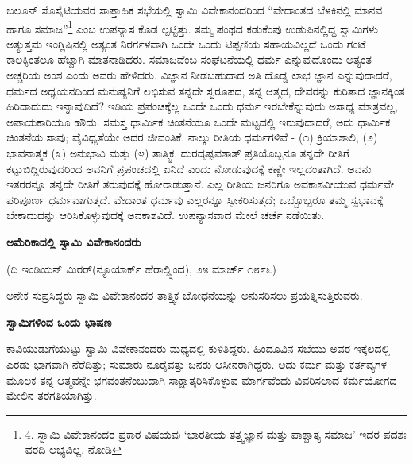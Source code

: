 ಬಲೂನ್ ಸೊಸೈಟಿಯವರ ಸಾಪ್ತಾಹಿಕ ಸಭೆಯಲ್ಲಿ ಸ್ವಾಮಿ ವಿವೇಕಾನಂದರಿಂದ “ವೇದಾಂತದ ಬೆಳಕಿನಲ್ಲಿ ಮಾನವ ಹಾಗೂ ಸಮಾಜ”\footnote{4. ಸ್ವಾಮಿ ವಿವೇಕಾನಂದರ ಪ್ರಕಾರ ವಿಷಯವು ‘ಭಾರತೀಯ ತತ್ತ್ವಜ್ಞಾನ ಮತ್ತು ಪಾಶ್ಚಾತ್ಯ ಸಮಾಜ’ ಇದರ ಪದಶಃ ವರದಿ ಲಭ್ಯವಿಲ್ಲ. ನೋಡಿ } ಎಂಬ ಉಪನ್ಯಾಸ ಕೊಡ ಲ್ಪಟ್ಟಿತ್ತು. ತಮ್ಮ ಪಂಥದ ಕಡುಕೆಂಪು ಉಡುಪಿನಲ್ಲಿದ್ದ ಸ್ವಾಮಿಗಳು ಅತ್ಯುತ್ತಮ ಇಂಗ್ಲಿಷಿನಲ್ಲಿ ಅತ್ಯಂತ ನಿರರ್ಗಳವಾಗಿ ಒಂದೇ ಒಂದು ಟಿಪ್ಪಣಿಯ ಸಹಾಯವಿಲ್ಲದೆ ಒಂದು ಗಂಟೆ ಕಾಲಕ್ಕಿಂತಲೂ ಹೆಚ್ಚಾಗಿ ಮಾತನಾಡಿದರು. ಸಮಾಜವೆಂಬ ಸಂಘಟನೆಯಲ್ಲಿ ಧರ್ಮ ಎನ್ನುವುದೊಂದು ಅತ್ಯಂತ ಅಚ್ಚರಿಯ ಅಂಶ ಎಂದು ಅವರು ಹೇಳಿದರು. ವಿಜ್ಞಾನ ನೀಡಬಹುದಾದ ಅತಿ ದೊಡ್ಡ ಲಾಭ ಜ್ಞಾನ ಎನ್ನುವುದಾದರೆ, ಧರ್ಮದ ಅಧ್ಯಯನದಿಂದ ಮನುಷ್ಯನಿಗೆ ಲಭಿಸುವ ತನ್ನದೇ ಸ್ವರೂಪದ, ತನ್ನ ಆತ್ಮದ, ದೇವರನ್ನು ಕುರಿತಾದ ಜ್ಞಾನಕ್ಕಿಂತ ಹಿರಿದಾದುದು ಇನ್ನಾವುದಿದೆ? ಇಡಿಯ ಪ್ರಪಂಚಕ್ಕೆಲ್ಲ ಒಂದೇ ಒಂದು ಧರ್ಮ ಇರಬೇಕೆನ್ನುವುದು ಅಸಾಧ್ಯ ಮಾತ್ರವಲ್ಲ, ಅಪಾಯಕಾರಿಯೂ ಹೌದು. ಸಮಸ್ತ ಧಾರ್ಮಿಕ ಚಿಂತನೆಯೂ ಒಂದೇ ಮಟ್ಟದಲ್ಲಿ ಇರುವುದಾದರೆ, ಅದು ಧಾರ್ಮಿಕ ಚಿಂತನೆಯ ಸಾವು; ವೈವಿಧ್ಯತೆಯೇ ಅದರ ಜೀವಂತಿಕೆ. ನಾಲ್ಕು ರೀತಿಯ ಧರ್ಮಗಳಿವೆ - (೧) ಕ್ರಿಯಾಶಾಲಿ, (೨) ಭಾವನಾತ್ಮಕ (೩) ಅನುಭಾವಿ ಮತ್ತು (೪) ತಾತ್ತ್ವಿಕ. ದುರದೃಷ್ಟವಶಾತ್ ಪ್ರತಿಯೊಬ್ಬನೂ ತನ್ನದೇ ರೀತಿಗೆ ಕಟ್ಟುಬಿದ್ದಿರುವುದರಿಂದ ಅವನಿಗೆ ಪ್ರಪಂಚದಲ್ಲಿ ಏನಿದೆ ಎಂದು ನೋಡುವುದಕ್ಕೆ ಕಣ್ಣೇ ಇಲ್ಲದಂತಾಗಿದೆ. ಅವನು ಇತರರನ್ನೂ ತನ್ನದೇ ರೀತಿಗೆ ತರುವುದಕ್ಕೆ ಹೋರಾಡುತ್ತಾನೆ. ಎಲ್ಲ ರೀತಿಯ ಜನರಿಗೂ ಅವಕಾಶವೀಯುವ ಧರ್ಮವೇ ಪರಿಪೂರ್ಣ ಧರ್ಮವಾಗುತ್ತದೆ. ವೇದಾಂತ ಧರ್ಮವು ಎಲ್ಲರನ್ನೂ ಸ್ವೀಕರಿಸುತ್ತದೆ; ಒಬ್ಬೊಬ್ಬರೂ ತಮ್ಮ ಸ್ವಭಾವಕ್ಕೆ ಬೇಕಾದುದನ್ನು ಆರಿಸಿಕೊಳ್ಳುವುದಕ್ಕೆ ಅವಕಾಶವಿದೆ. ಉಪನ್ಯಾಸವಾದ ಮೇಲೆ ಚರ್ಚೆ ನಡೆಯಿತು.

\begin{center}
\textbf{ಅಮೆರಿಕಾದಲ್ಲಿ ಸ್ವಾಮಿ ವಿವೇಕಾನಂದರು}
\end{center}

\begin{center}
(ದಿ ಇಂಡಿಯನ್ ಮಿರರ್(ನ್ಯೂಯಾರ್ಕ್ ಹೆರಾಲ್ಡ್ನಿಂದ), ೨೫ ಮಾರ್ಚ್ ೧೮೯೬)
\end{center}

ಅನೇಕ ಸುಪ್ರಸಿದ್ಧರು ಸ್ವಾಮಿ ವಿವೇಕಾನಂದರ ತಾತ್ತ್ವಿಕ ಬೋಧನೆಯನ್ನು ಅನುಸರಿಸಲು ಪ್ರಯತ್ನಿಸುತ್ತಿರುವರು.

\begin{center}
\textbf{ಸ್ವಾಮಿಗಳಿಂದ ಒಂದು ಭಾಷಣ}
\end{center}

ಕಾವಿಯುಡುಗೆಯುಟ್ಟು ಸ್ವಾಮಿ ವಿವೇಕಾನಂದರು ಮಧ್ಯದಲ್ಲಿ ಕುಳಿತಿದ್ದರು. ಹಿಂದೂವಿನ ಸಭೆಯು ಅವರ ಇಕ್ಕೆಲದಲ್ಲಿ ಎರಡು ಭಾಗವಾಗಿ ನೆರೆದಿತ್ತು; ಸುಮಾರು ನೂರೈವತ್ತು ಜನರು ಆಸೀನರಾಗಿದ್ದರು. ಅದು ಕರ್ಮ ಮತ್ತು ಕರ್ತವ್ಯಗಳ ಮೂಲಕ ತನ್ನ ಆತ್ಮವನ್ನೇ ಭಗವಂತನೆಂಬುದಾಗಿ ಸಾಕ್ಷಾತ್ಕರಿಸಿಕೊಳ್ಳುವ ಮಾರ್ಗವೆಂದು ವಿವರಿಸಲಾದ ಕರ್ಮಯೋಗದ ಮೇಲಿನ ತರಗತಿಯಾಗಿತ್ತು.

